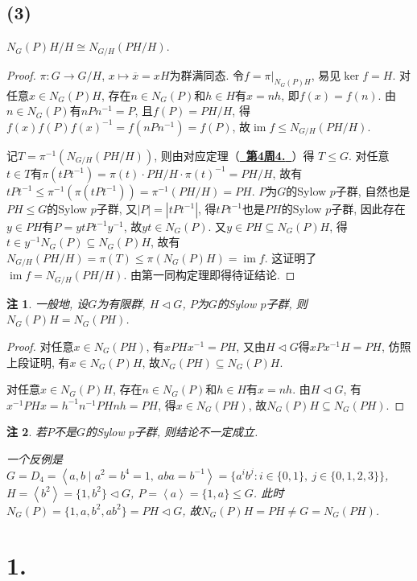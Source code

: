 \documentclass[12pt, a4paper, fontset=windows]{ctexart}
\newcommand{\abs}[1]{\left|{#1}\right|}
\newcommand{\cl}[1]{\overline{#1}} %
\newcommand{\gen}[1]{\left\langle{#1}\right\rangle}
\newcommand{\im}{\operatorname{im}}
\newcommand{\isom}{\cong} %
\newcommand{\kh}[1]{（{#1}）} %
\newcommand{\myref}[2][]{\hyperref[#1]{\bf\color{blue}\ {#2}\ }}
\newtheorem*{remark}{注}
\begin{document}
\subsection*{(3)}

$N_G(P)H/H\isom N_{G/H}(PH/H)$. 

\begin{proof}
$\pi:G\to G/H$, $x\mapsto\cl{x}=xH$为群满同态. 
令$f=\pi|_{N_G(P)H}$, 易见$\ker f=H$. 
对任意$x\in N_G(P)H$, 存在$n\in N_G(P)$和$h\in H$有$x=nh$, 即$f(x)=f(n)$. 
由$n\in N_G(P)$有$nPn^{-1}=P$, 且$f(P)=PH/H$, 得$f(x)f(P)f(x)^{-1}=f(nPn^{-1})=f(P)$, 
故$\im f\le N_{G/H}(PH/H)$. 

记$T=\pi^{-1}(N_{G/H}(PH/H))$, 则由对应定理\kh{\myref[group-correspond]{第4周4.}}得
$T\le G$. 对任意$t\in T$有$\pi(tPt^{-1})=\pi(t)\cdot PH/H\cdot\pi(t)^{-1}=PH/H$, 
故有$tPt^{-1}\le\pi^{-1}(\pi(tPt^{-1}))=\pi^{-1}(PH/H)=PH$. 
$P$为$G$的Sylow $p$子群, 自然也是$PH\le G$的Sylow $p$子群, 
又$\abs{P}=\abs{tPt^{-1}}$, 得$tPt^{-1}$也是$PH$的Sylow $p$子群, 
因此存在$y\in PH$有$P=ytPt^{-1}y^{-1}$, 故$yt\in N_G(P)$. 
又$y\in PH\subseteq N_G(P)H$, 得$t\in y^{-1}N_G(P)\subseteq N_G(P)H$, 
故有$N_{G/H}(PH/H)=\pi(T)\le\pi(N_G(P)H)=\im f$. 
这证明了$\im f=N_{G/H}(PH/H)$. 由第一同构定理即得待证结论. 
\end{proof}

\begin{remark}
一般地, 设$G$为有限群, $H\lhd G$, $P$为$G$的Sylow $p$子群, 则$N_G(P)H=N_G(PH)$. 
\end{remark}

\begin{proof}
对任意$x\in N_G(PH)$, 有$xPHx^{-1}=PH$, 又由$H\lhd G$得$xPx^{-1}H=PH$, 
仿照上段证明, 有$x\in N_G(P)H$, 故$N_G(PH)\subseteq N_G(P)H$. 

对任意$x\in N_G(P)H$, 存在$n\in N_G(P)$和$h\in H$有$x=nh$. 
由$H\lhd G$, 有$x^{-1}PHx=h^{-1}n^{-1}PHnh=PH$, 得$x\in N_G(PH)$, 
故$N_G(P)H\subseteq N_G(PH)$. 
\end{proof}

\begin{remark}
若$P$不是$G$的Sylow $p$子群, 则结论不一定成立. 

一个反例是$G=D_4=\gen{a,b\mid a^2=b^4=1,\ aba=b^{-1}}
=\{a^ib^j:i\in\{0,1\},\ j\in\{0,1,2,3\}\}$, 
$H=\gen{b^2}=\{1,b^2\}\lhd G$, $P=\gen{a}=\{1,a\}\le G$. 
此时$N_G(P)=\{1,a,b^2,ab^2\}=PH\lhd G$, 
故$N_G(P)H=PH\ne G=N_G(PH)$. 
\end{remark}

\section*{1.}
\end{document}
